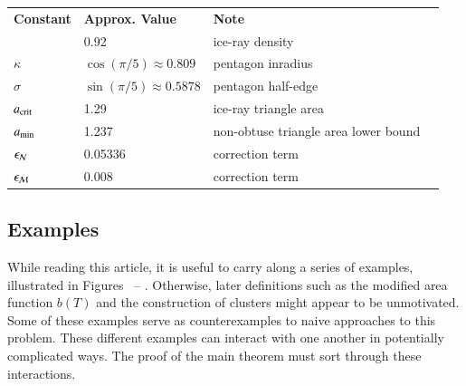 \bigskip
{}%
{
\begin{tabular}{llll}
{\bf Constant} & {\bf Approx. Value} & {\bf Note} \\
& 0.92 & ice-ray density\\
$\kappa$ & $\cos(\pi/5)\approx 0.809$ & pentagon inradius \\
$\sigma$ &$\sin(\pi/5)\approx 0.5878$ & pentagon half-edge \\
$a_\text{crit}$ &1.29 & ice-ray triangle area\\
$a_\text{min}$ & 1.237 & non-obtuse triangle area lower bound\\
$\epsilon_{\mathcal N}$ & 0.05336 & correction term\\
$\epsilon_{\mathcal M}$ & 0.008 & correction term\\
\end{tabular}
}

\subsection{Examples}

While reading this article, it is useful to carry along a series of examples,
illustrated in Figures~ -- .
Otherwise, later definitions such as the modified area function $b(T)$
and the construction of clusters might appear to be unmotivated.  Some
of these examples serve as counterexamples to naive approaches to this
problem.  These different examples can interact with one another in
potentially complicated ways.  The proof of the main theorem must sort
through these interactions.

